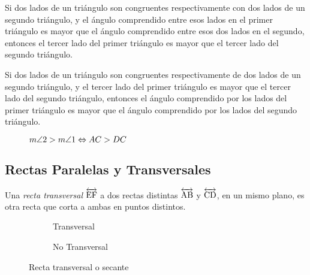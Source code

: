 \begin{theorem}
    Si dos lados de un triángulo son congruentes respectivamente con dos lados de un segundo triángulo, y el ángulo comprendido entre esos lados en el primer triángulo es mayor que el ángulo comprendido entre esos dos lados en el segundo, entonces el tercer lado del primer triángulo es mayor que el tercer lado del segundo triángulo.
\end{theorem}

\begin{theorem}
    Si dos lados de un triángulo son congruentes respectivamente de dos lados de un segundo triángulo, y el tercer lado del primer triángulo es mayor que el tercer lado del segundo triángulo, entonces el ángulo comprendido por los lados del primer triángulo es mayor que el ángulo comprendido por los lados del segundo triángulo.

    \begin{figure}[!h]
        \centering
        
        \caption{$m\angle{2} > m\angle{1} \Leftrightarrow AC > DC$}
        \label{fig:charnela-reciproco}
    \end{figure}
    
\end{theorem}

\clearpage

\subsection{Rectas Paralelas y Transversales}

\begin{definition}
    Una \textit{recta transversal} $\overleftrightarrow{\rm EF}$ a dos rectas distintas $\overleftrightarrow{\rm AB}$ y $\overleftrightarrow{\rm CD}$, en un mismo plano, es otra recta que corta a ambas en puntos distintos.


    \begin{figure}[h!]

        \centering

        \begin{subfigure}[b]{.5\textwidth}
            \centering
            
            \label{fig:transversal}
            \caption{Transversal}
        \end{subfigure}%
        \begin{subfigure}[b]{.5\textwidth}
            \centering
            
            \label{fig:no-transversal}
            \caption{No Transversal}
        \end{subfigure}

        \centering
        \caption{Recta transversal o secante}
        \label{fig:transversal-line}
        
    \end{figure}        
    
\end{definition}

